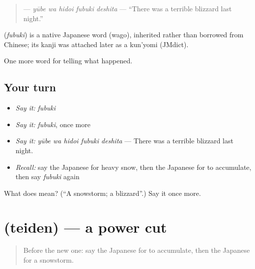\begin{quote}
\textbf{  } — \emph{yūbe wa hidoi fubuki deshita} — \textquotedblleft{}There was a terrible blizzard last night.\textquotedblright{}
\end{quote}

\begin{cousinweb}
\textbf{} (\emph{fubuki}) is a native Japanese word (wago), inherited rather than borrowed from Chinese; its kanji was attached later as a kun'yomi (JMdict).
\end{cousinweb}

\begin{grammarlens}[title={What you've built}]
One more word for telling what happened.
\end{grammarlens}

\subsection*{Your turn}
\begin{itemize}
\raggedright
  \item \emph{Say it:} \emph{fubuki}
  \item \emph{Say it:} \emph{fubuki}, once more
  \item \emph{Say it:} \emph{yūbe wa hidoi fubuki deshita} — There was a terrible blizzard last night.
  \item \emph{Recall:} say the Japanese for heavy snow, then the Japanese for to accumulate, then say \emph{fubuki} again
\end{itemize}

\begin{tcolorbox}[breakable,colback=teal!4,colframe=teal!35!black,title={Before you move on}]
What does  mean? (\textquotedblleft{}A snowstorm; a blizzard\textquotedblright{}.) Say it once more.
\end{tcolorbox}
\section[\texorpdfstring{\ja{ていでん} (teiden)}{ていでん (teiden)}]{ (teiden) — a power cut}

\label{lesson:JA-C277-teiden}



\begin{quote}
Before the new one: say the Japanese for to accumulate, then the Japanese for a snowstorm.
\end{quote}

